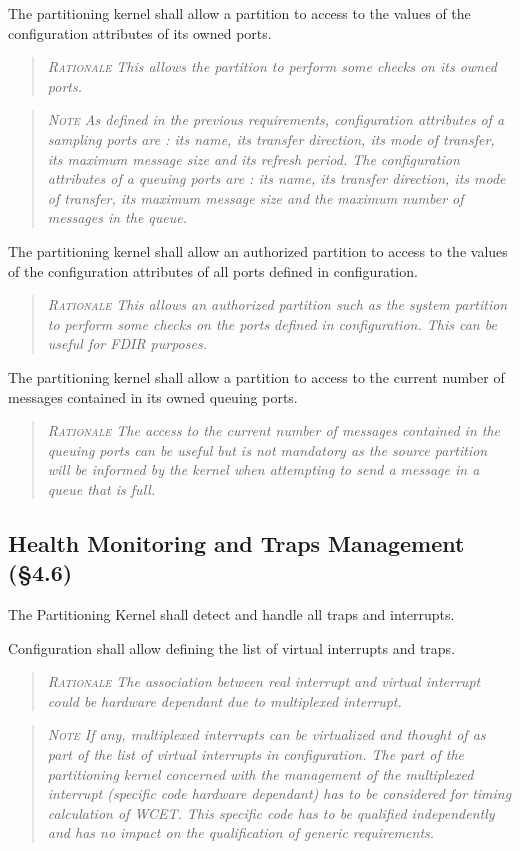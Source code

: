 The partitioning kernel shall allow a partition to access to the values of the configuration attributes of its owned ports.
\begin{quote}\it
\textsc{Rationale}
This allows the partition to perform some checks on its owned ports.
\end{quote}
\begin{quote}\it
\textsc{Note}
As defined in the previous requirements, configuration attributes of a sampling ports are : its name, its transfer direction, its mode of transfer, its maximum message size and its refresh period.
The configuration attributes of a queuing ports are :  its name, its transfer direction, its mode of transfer, its maximum message size and the maximum number of messages in the queue.
\end{quote}

The partitioning kernel shall allow an authorized partition to access to the values of the configuration attributes of all ports defined in configuration.
\begin{quote}\it
\textsc{Rationale}
This allows an authorized partition such as the  system partition to perform some checks on the ports defined in configuration. This can be useful for FDIR purposes.
\end{quote}

The partitioning kernel shall allow a partition to access to the current number of messages contained in its owned queuing ports.
\begin{quote}\it
\textsc{Rationale}
The access to the current number of messages contained in the queuing ports can be useful but is not mandatory as the source partition will be informed by the kernel when attempting to send a message in a queue that is full.
\end{quote}

\subsection{Health Monitoring and Traps Management (\S4.6)}

The Partitioning Kernel shall detect and handle all traps and interrupts.

Configuration shall allow defining the list of virtual interrupts and traps.
\begin{quote}\it
\textsc{Rationale}
The association between real interrupt and virtual interrupt could be hardware dependant due to multiplexed interrupt.
\end{quote}
\begin{quote}\it
\textsc{Note}
If any, multiplexed interrupts can be virtualized and thought of as part of the list of virtual interrupts in configuration. The part of the partitioning kernel concerned with the management of the multiplexed interrupt (specific code hardware dependant) has to be considered for timing calculation of WCET. This specific code has to be qualified independently and has no impact on the qualification of generic requirements.
\end{quote}

